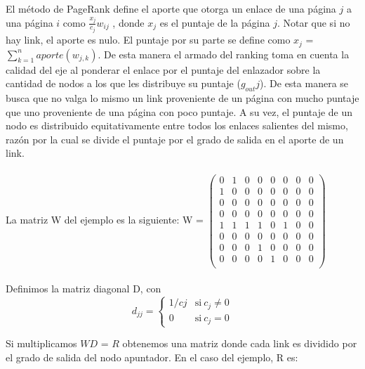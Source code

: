 El método de PageRank define el aporte que otorga un enlace de una página $j$ a una página $i$ como $\frac{x_{j}}{c_{j}} w_{ij}$ , donde $x_{j}$ es el puntaje de la página $j$. Notar que si no hay link, el aporte es nulo.
El puntaje por su parte se define como $x_{j}$ = $\sum_{k=1}^{n} aporte (w_{j,k})$. De esta manera el armado del ranking toma en cuenta la calidad del eje al ponderar el enlace por el puntaje del enlazador sobre la cantidad de nodos a los que les distribuye su puntaje ($g_{out} j$). De esta manera se busca que no valga lo mismo un link proveniente de un página con mucho puntaje que uno proveniente de una página con poco puntaje. A su vez, el puntaje de un nodo es distribuido equitativamente entre todos los enlaces salientes del mismo, razón por la cual se divide el puntaje por el grado de salida en el aporte de un link. \\ \\

La matriz W del ejemplo es la siguiente: W = 
$ \begin{pmatrix}
  0 & 1 & 0 & 0 & 0 & 0 & 0 & 0 \\
 1 & 0 & 0 & 0 & 0 & 0 & 0 & 0  \\
  0 & 0 & 0 & 0 & 0 & 0 & 0 & 0  \\
   0 & 0 & 0 & 0 & 0 & 0 & 0 & 0  \\
    1 & 1 & 1 & 1 & 0 & 1 & 0 & 0  \\
     0 & 0 & 0 & 0 & 0 & 0 & 0 & 0  \\
      0 & 0 & 0 & 1 & 0 & 0 & 0 & 0  \\
       0 & 0 & 0 & 0 & 1 & 0 & 0 & 0  \\
 \end{pmatrix}$ \\ \\ 
 
 Definimos la matriz diagonal D, con     
    \begin{equation*}
        d_{jj} = \left\{
                \begin{array}{ll}
                     1/cj & \mathrm{si\ } c_j \neq 0 \\
                     0    & \mathrm{si\ } c_j = 0
                \end{array}
            \right.
    \end{equation*} 

Si multiplicamos $WD$ = $R$ obtenemos una matriz donde cada link es dividido por el grado de salida del nodo apuntador. En el caso del ejemplo, R es: \\ \\



